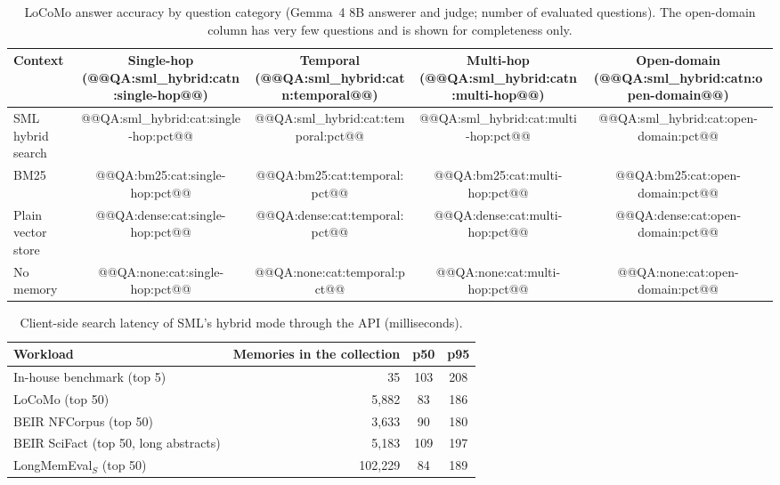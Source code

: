 \documentclass[11pt,a4paper]{article}
\theoremstyle{remark}
\newcommand{\sys}{SML}
\begin{document}
\begin{table}[htbp]
\centering
\small
\caption{LoCoMo answer accuracy by question category (Gemma~4 8B answerer and judge; number of evaluated questions). The
open-domain column has very few questions and is shown for completeness only.}
\label{tab:qacat}
\begin{tabular}{@{}lcccc@{}}
\toprule
Context & Single-hop (@@QA:sml_hybrid:catn:single-hop@@) & Temporal (@@QA:sml_hybrid:catn:temporal@@) & Multi-hop (@@QA:sml_hybrid:catn:multi-hop@@) & Open-domain (@@QA:sml_hybrid:catn:open-domain@@) \\
\midrule
\sys{} hybrid search & @@QA:sml_hybrid:cat:single-hop:pct@@ & @@QA:sml_hybrid:cat:temporal:pct@@ & @@QA:sml_hybrid:cat:multi-hop:pct@@ & @@QA:sml_hybrid:cat:open-domain:pct@@ \\
BM25 & @@QA:bm25:cat:single-hop:pct@@ & @@QA:bm25:cat:temporal:pct@@ & @@QA:bm25:cat:multi-hop:pct@@ & @@QA:bm25:cat:open-domain:pct@@ \\
Plain vector store & @@QA:dense:cat:single-hop:pct@@ & @@QA:dense:cat:temporal:pct@@ & @@QA:dense:cat:multi-hop:pct@@ & @@QA:dense:cat:open-domain:pct@@ \\
No memory & @@QA:none:cat:single-hop:pct@@ & @@QA:none:cat:temporal:pct@@ & @@QA:none:cat:multi-hop:pct@@ & @@QA:none:cat:open-domain:pct@@ \\
\bottomrule
\end{tabular}
\end{table}

\begin{table}[htbp]
\centering
\small
\caption{Client-side search latency of \sys{}'s hybrid mode through the API (milliseconds).}
\label{tab:latency}
\begin{tabular}{@{}lrcc@{}}
\toprule
Workload & Memories in the collection & p50 & p95 \\
\midrule
In-house benchmark (top 5) & 35 & 103 & 208 \\
LoCoMo (top 50) & 5{,}882 & 83 & 186 \\
BEIR NFCorpus (top 50) & 3{,}633 & 90 & 180 \\
BEIR SciFact (top 50, long abstracts) & 5{,}183 & 109 & 197 \\
LongMemEval$_S$ (top 50) & 102{,}229 & 84 & 189 \\
\bottomrule
\end{tabular}
\end{table}
\end{document}

